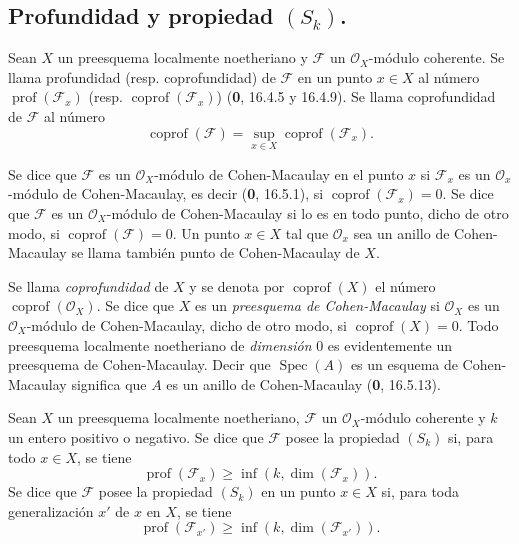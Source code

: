 \subsection{\texorpdfstring{Profundidad y propiedad $(S_k)$.}{Profundidad y propiedad (S\string_k)}}

\begin{definition}[5.7.1]
\label{IV.2.s5.7.1-fr}
Sean $X$ un preesquema localmente noetheriano y $\mathscr F$ un
$\mathcal O_X$-módulo coherente. Se llama profundidad \textup{(resp.}
coprofundidad\textup{)} de $\mathscr F$ en un punto $x\in X$ al número
$\operatorname{prof}(\mathscr F_x)$ \textup{(resp.}
$\operatorname{coprof}(\mathscr F_x)$\textup{)} \textup{(\textbf{0}, 16.4.5 y 16.4.9)}. Se llama
coprofundidad de $\mathscr F$ al número
\begin{equation}
\operatorname{coprof}(\mathscr F)
=\sup_{x\in X}\operatorname{coprof}(\mathscr F_x).
\tag{5.7.1.1}\label{IV.2.s5.7.1.1-fr}
\end{equation}

Se dice que $\mathscr F$ es un $\mathcal O_X$-módulo de Cohen-Macaulay en el
punto $x$ si $\mathscr F_x$ es un $\mathcal O_x$-módulo de Cohen-Macaulay,
es decir \textup{(\textbf{0}, 16.5.1)}, si $\operatorname{coprof}(\mathscr F_x)=0$. Se dice que
$\mathscr F$ es un $\mathcal O_X$-módulo de Cohen-Macaulay si lo es en todo
punto, dicho de otro modo, si $\operatorname{coprof}(\mathscr F)=0$. Un punto
$x\in X$ tal que $\mathcal O_x$ sea un anillo de Cohen-Macaulay se llama
también punto de Cohen-Macaulay de $X$.
\end{definition}

Se llama \emph{coprofundidad} de $X$ y se denota por
$\operatorname{coprof}(X)$ el número $\operatorname{coprof}(\mathcal O_X)$.
Se dice que $X$ es un \emph{preesquema de Cohen-Macaulay} si $\mathcal O_X$
es un $\mathcal O_X$-módulo de Cohen-Macaulay, dicho de otro modo, si
$\operatorname{coprof}(X)=0$. Todo preesquema localmente noetheriano de
\emph{dimensión} 0 es evidentemente un preesquema de Cohen-Macaulay. Decir que
$\operatorname{Spec}(A)$ es un esquema de Cohen-Macaulay significa que $A$
es un anillo de Cohen-Macaulay (\textbf 0, 16.5.13).

\begin{definition}[5.7.2]
\label{IV.2.s5.7.2-fr}
Sean $X$ un preesquema localmente noetheriano, $\mathscr F$ un
$\mathcal O_X$-módulo coherente y $k$ un entero positivo o negativo. Se dice
que $\mathscr F$ posee la propiedad $(S_k)$ si, para todo $x\in X$, se tiene
\begin{equation}
\operatorname{prof}(\mathscr F_x)\geq
\inf(k,\dim(\mathscr F_x)).
\tag{5.7.2.1}\label{IV.2.s5.7.2.1-fr}
\end{equation}
Se dice que $\mathscr F$ posee la propiedad $(S_k)$ en un punto $x\in X$ si,
para toda generalización $x'$ de $x$ en $X$, se tiene
\begin{equation}
\operatorname{prof}(\mathscr F_{x'})\geq
\inf(k,\dim(\mathscr F_{x'})).
\tag{5.7.2.2}\label{IV.2.s5.7.2.2-fr}
\end{equation}
\end{definition}

